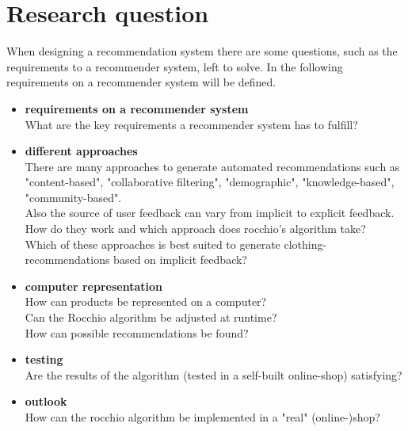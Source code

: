 

\section{Research question}
When designing a recommendation system there are some questions, such as the requirements to a recommender system, left to solve.
In the following requirements on a recommender system will be defined.

\begin{itemize}
    \item \textbf{requirements on a recommender system}\\
        What are the key requirements a recommender system has to fulfill?

    \item \textbf{different approaches}\\
        There are many approaches to generate automated recommendations such as "content-based", "collaborative filtering", "demographic", "knowledge-based", "community-based".\citep[p.~10-12]{ricci:11}\\
        Also the source of user feedback can vary from implicit to explicit feedback.\citep[p. 76]{lops:11}\\
        How do they work and which approach does rocchio's algorithm take?\\
        Which of these approaches is best suited to generate clothing-recommendations based on implicit feedback?

    \item \textbf{computer representation}\\
        How can products be represented on a computer?\\
        Can the Rocchio algorithm be adjusted at runtime?\\
        How can possible recommendations be found?

    \item \textbf{testing}\\
        Are the results of the algorithm (tested in a self-built online-shop) satisfying?

    \item \textbf{outlook}\\
        How can the rocchio algorithm be implemented in a "real" (online-)shop?
        
\end{itemize}






